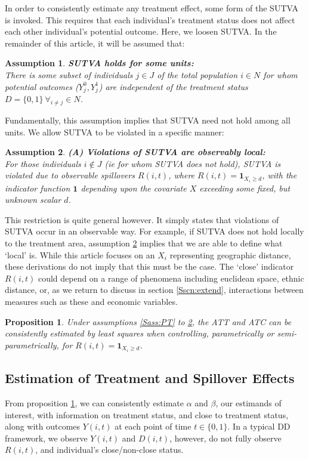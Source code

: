 \documentclass{article}
\newtheorem{assumption}{Assumption}
\newtheorem{proposition}{Proposition}
\begin{document}
\begin{spacing}{1.1}
In order to consistently estimate any treatment effect, some form of the
SUTVA is invoked.  This requires that each individual's treatment status does
not affect each other individual's potential outcome.  Here, we loosen SUTVA.
In the remainder of this article, it will be assumed that:
\begin{assumption}
\label{Sass:SUTVAs}
\textbf{SUTVA holds for some units:} \\
There is some subset of individuals $j\in J$ of the total population $i\in N$ 
for whom potential outcomes ($Y_j^0, Y_j^1$) are independent of the treatment 
status $D=\{0,1\}\ \forall_{i\neq j} \in N$.
\end{assumption}
\noindent Fundamentally, this assumption implies that SUTVA need not hold among 
all units.  We allow SUTVA to be violated in a specific manner:
\begin{assumption}
\label{Sass:SUTVAl}
\textbf{(A) Violations of SUTVA are observably local:} \\ 
For those individuals $i\notin J$ (ie for whom SUTVA does not hold), SUTVA is
violated due to observable spillovers $R(i,t)$, where 
$R(i,t)=\mathbf{1}_{X_i\geq d}$, with the indicator function $\mathbf{1}$
depending upon the covariate $X$ exceeding some fixed, but unknown scalar $d$.
\end{assumption}
\vspace{-4mm}
\noindent This restriction is quite general however.  It simply states that
violations of SUTVA occur in an observable way.  For example, if SUTVA does
not hold locally to the treatment area, assumption \ref{Sass:SUTVAl} implies
that we are able to define what `local' is.  While this article focuses on
an $X_i$ representing geographic distance, these derivations do not imply that 
this must be the case.  The `close' indicator $R(i,t)$ could depend on a range 
of phenomena including euclidean space, ethnic distance, or, as we return to
discuss in section \ref{Sscn:extend}, interactions between measures such as 
these and economic variables.


\begin{proposition}
\label{Pass:ATT}
Under assumptions \ref{Sass:PT} to \ref{Sass:SUTVAl}, the ATT and ATC can be 
consistently estimated by least squares when controlling, parametrically or
semi-parametrically, for $R(i,t)=\mathbf{1}_{X_i\geq d}$.
\end{proposition}


\subsection{Estimation of Treatment and Spillover Effects}
From proposition \ref{Pass:ATT}, we can consistently estimate $\alpha$
and $\beta$, our estimands of interest, with information on treatment
status, and close to treatment status, along with outcomes $Y(i,t)$ at
each point of time $t\in\{0,1\}$.  In a typical DD framework, we
observe $Y(i,t)$ and $D(i,t)$, however, do not fully observe $R(i,t)$,
and individual's close/non-close status.


\end{spacing}
\end{document}
